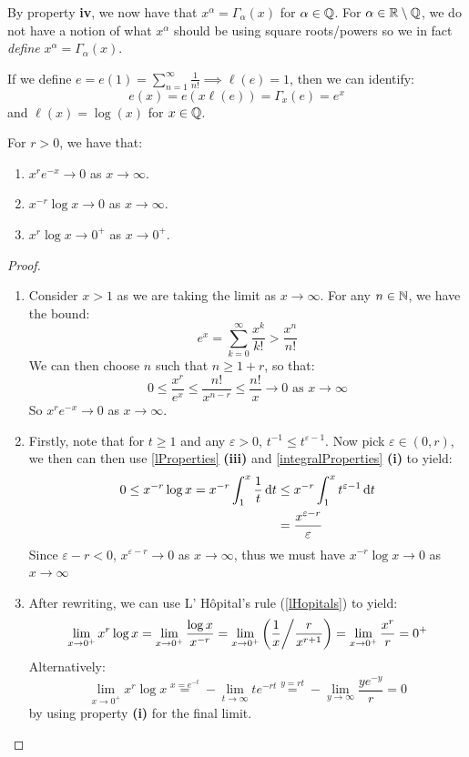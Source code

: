 \documentclass[../main.tex]{subfiles}
\begin{document}
By property \textbf{iv}, we now have that  $x^{\alpha} = \Gamma_{\alpha}(x)$ for $\alpha \in \mathbb{Q}$.
For $\alpha \in \mathbb{R} \setminus \mathbb{Q}$, we do not have a notion of what $x^{\alpha}$ should be using square roots/powers so we in fact \textit{define} $x^{\alpha} = \Gamma_{\alpha}(x)$.

If we define $e = e(1) = \sum_{n = 1}^{\infty} \frac{1}{n!} \implies \ell(e) = 1$, then we can identify:
\[
  e(x) = e(x \ell(e)) = \Gamma_{x}(e) = e^{x}
\]
and $\ell(x) = \log(x)$ for $x \in \mathbb{Q}$.
\begin{proposition}
  For $r > 0$, we have that:
  \begin{enumerate}
    \item $x^{r}e^{-x} \to 0$ as $x \to \infty$.
    \item $x^{-r}\log x \to 0$ as $x \to \infty$.
    \item $x^{r} \log x \to 0^{+}$ as $x \to 0^{+}$.
  \end{enumerate}
\end{proposition}
\begin{proof}
  \begin{enumerate}
    \item Consider $x > 1$ as we are taking the limit as $x \to \infty$.
      For any $n \in \mathbb{N}$, we have the bound:
      \[
        e^{x} = \sum_{k = 0}^{\infty} \frac{x^{k}}{k!} > \frac{x^{n}}{n!}
      \]
      We can then choose $n$ such that $n \geq 1 + r$, so that:
      \[
        0 \leq \frac{x^{r}}{e^{x}} \leq \frac{n!}{x^{n - r}} \leq \frac{n!}{x} \to 0 \text{ as } x \to \infty
      \]
      So $x^{r} e^{-x} \to 0$ as $x \to \infty$.
    \item Firstly, note that for $t \geq 1$ and any $\varepsilon > 0$, $t^{-1} \leq t^{\varepsilon - 1}$.
      Now pick $\varepsilon \in (0, r)$, we then can then use \cref{lProperties} \textbf{(iii)} and \cref{integralProperties} \textbf{(i)} to yield:
      \begin{align*}
        0 \leq x^{-r}\log x = x^{-r} \int_{1}^{x} \frac{1}{t} \d{t} &\leq x^{-r} \int_{1}^{x} t^{\varepsilon - 1} \d{t} \\
                                                                    &= \frac{x^{\varepsilon - r}}{\varepsilon}
      \end{align*}
      Since $\varepsilon - r < 0$, $x^{\varepsilon - r} \to 0$ as $x \to \infty$, thus we must have $x^{-r}\log x \to 0$ as $x \to \infty$
    \item
      After rewriting, we can use L' H\^opital's rule (\cref{lHopitals}) to yield:
      \[
        \lim_{x \to 0^{+}} x^{r} \log x = \lim_{x \to 0^{+}} \frac{\log x}{x^{-r}} = \lim_{x \to 0^{+}} \left(\frac{1}{x}\middle/ \frac{r}{x^{r + 1}}\right) = \lim_{x \to 0^{+}} \frac{x^{r}}{r} = 0^{+}
      \]
      Alternatively:
      \[
        \lim_{x \to 0^{+}} x^{r} \log x \stackrel{x = e^{-t}}= - \lim_{t \to \infty} t e^{-rt} \stackrel{y = rt}= -\lim_{y \to \infty} \frac{ye^{-y}}{r} = 0
      \]
      by using property \textbf{(i)} for the final limit.
  \end{enumerate}
\end{proof}
\end{document}
